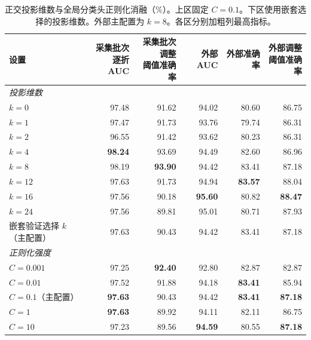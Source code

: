 \begin{table}[htbp]
\centering\small
\caption{正交投影维数与全局分类头正则化消融（\%）。上区固定 $C=0.1$。下区使用嵌套选择的投影维数。外部主配置为 $k=8$。各区分别加粗列最高指标。}
\label{tab:ablk}
\begin{adjustbox}{max width=\linewidth}
\begin{tabular}{lrrrrr}
\toprule
设置 & \makecell{采集批次逐折\\AUC} & \makecell{采集批次调整\\阈值准确率} & 外部 AUC & 外部准确率 & \makecell{外部调整\\阈值准确率}\\
\midrule
\multicolumn{6}{l}{\textit{投影维数}}\\
\addlinespace[2pt]
$k=0$ & 97.48 & 91.62 & 94.02 & 80.60 & 86.75\\
$k=1$ & 97.47 & 91.73 & 93.76 & 79.74 & 86.31\\
$k=2$ & 96.55 & 91.42 & 93.62 & 80.23 & 86.31\\
$k=4$ & \textbf{98.24} & 93.69 & 94.49 & 82.60 & 86.96\\
$k=8$ & 98.19 & \textbf{93.90} & 94.42 & 83.41 & 87.18\\
$k=12$ & 97.63 & 91.73 & 94.94 & \textbf{83.57} & 88.04\\
$k=16$ & 97.56 & 90.18 & \textbf{95.60} & 80.82 & \textbf{88.47}\\
$k=24$ & 97.56 & 89.81 & 95.01 & 80.71 & 87.93\\
嵌套验证选择 $k$（主配置） & 97.63 & 90.43 & 94.42 & 83.41 & 87.18\\
\midrule
\multicolumn{6}{l}{\textit{正则化强度}}\\
\addlinespace[2pt]
$C=0.001$ & 97.25 & \textbf{92.40} & 92.80 & 82.87 & 82.87\\
$C=0.01$ & 97.52 & 91.88 & 94.18 & \textbf{83.41} & 85.94\\
$C=0.1$（主配置） & \textbf{97.63} & 90.43 & 94.42 & \textbf{83.41} & \textbf{87.18}\\
$C=1$ & \textbf{97.63} & 89.92 & 94.11 & 82.11 & 86.75\\
$C=10$ & 97.23 & 89.56 & \textbf{94.59} & 80.55 & \textbf{87.18}\\
\bottomrule
\end{tabular}
\end{adjustbox}
\end{table}
